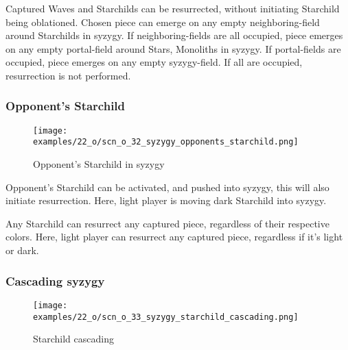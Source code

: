 Captured Waves and Starchilds can be resurrected, without initiating Starchild being
oblationed. Chosen piece can emerge on any empty neighboring-field around Starchilds
in syzygy. If neighboring-fields are all occupied, piece emerges on any empty
portal-field around Stars, Monoliths in syzygy. If portal-fields are occupied, piece
emerges on any empty syzygy-field. If all are occupied, resurrection is not performed.

\clearpage %

\subsubsection*{Opponent's Starchild}

\vspace*{-1.2\baselineskip}
\noindent
\begin{figure}[!h]
\texttt{[image: examples/22\_o/scn\_o\_32\_syzygy\_opponents\_starchild.png]}
\caption{Opponent's Starchild in syzygy}
\label{fig:scn_o_32_syzygy_opponents_starchild}
\end{figure}

Opponent's Starchild can be activated, and pushed into syzygy, this will also initiate
resurrection. Here, light player is moving dark Starchild into syzygy.

Any Starchild can resurrect any captured piece, regardless of their respective colors.
Here, light player can resurrect any captured piece, regardless if it's light or dark.

\clearpage %

\subsubsection*{Cascading syzygy}

\vspace*{-1.2\baselineskip}
\noindent
\begin{figure}[!h]
\texttt{[image: examples/22\_o/scn\_o\_33\_syzygy\_starchild\_cascading.png]}
\caption{Starchild cascading}
\label{fig:scn_o_33_syzygy_starchild_cascading}
\end{figure}

